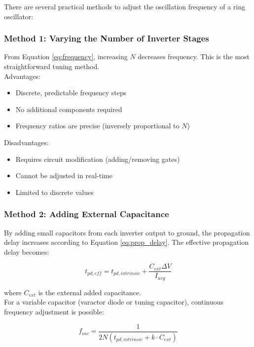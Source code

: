 \documentclass[10pt]{article}
\begin{document}
There are several practical methods to adjust the oscillation frequency of a ring oscillator:

\subsubsection{Method 1: Varying the Number of Inverter Stages}

From Equation \ref{eq:frequency}, increasing $N$ decreases frequency.  This is the most straightforward tuning method.\\

Advantages:
\begin{itemize}
    \item Discrete, predictable frequency steps
    \item No additional components required
    \item Frequency ratios are precise (inversely proportional to $N$)
\end{itemize}

Disadvantages: 
\begin{itemize}
    \item Requires circuit modification (adding/removing gates)
    \item Cannot be adjusted in real-time
    \item Limited to discrete values
\end{itemize}

\subsubsection{Method 2: Adding External Capacitance}

By adding small capacitors from each inverter output to ground, the propagation delay increases according to Equation \ref{eq:prop_delay}. The effective propagation delay becomes:

\begin{equation}
    t_{pd,eff} = t_{pd,intrinsic} + \frac{C_{ext} \Delta V}{I_{avg}}
    \label{eq:prop_delay_ext}
\end{equation}

where $C_{ext}$ is the external added capacitance. \\

For a variable capacitor (varactor diode or tuning capacitor), continuous frequency adjustment is possible: 

\begin{equation}
    f_{osc} = \frac{1}{2N(t_{pd,intrinsic} + k \cdot C_{ext})}
    \label{eq:freq_tuned}
\end{equation}
\end{document}
